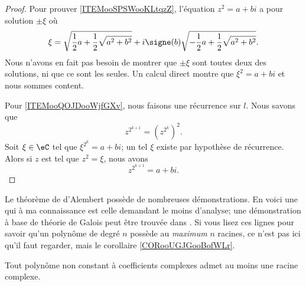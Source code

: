 \begin{proof}
    Pour prouver \ref{ITEMooSPSWooKLtqzZ}, l'équation \( z^2=a+bi\) a pour solution \( \pm\xi\) où
        \begin{equation}
            \xi=\sqrt{ \frac{ 1 }{2}a+\frac{ 1 }{2}\sqrt{ a^2+b^2 } }+i\signe(b)\sqrt{ -\frac{ 1 }{2}a+\frac{ 1 }{2}\sqrt{ a^2+b^2 } }.
        \end{equation}
        Nous n'avons en fait pas besoin de montrer que \( \pm\xi\) sont toutes deux des solutions, ni que ce sont les seules. Un calcul direct montre que \( \xi^2=a+bi\) et nous sommes content.

    Pour \ref{ITEMooQOJDooWjfGXv}, nous faisons une récurrence sur \( l\). Nous savons que
        \begin{equation}
            z^{2^{k+1}}=(z^{2^k})^2.
        \end{equation}
        Soit \( \xi\in \eC\) tel que \( \xi^{2^k}=a+bi\); un tel \( \xi\) existe par hypothèse de récurrence. Alors si \( z\) est tel que \( z^2=\xi\), nous avons 
        \begin{equation}
            z^{2^{k+1}}=a+bi.
        \end{equation}
\end{proof}

Le théorème de d'Alembert possède de nombreuses démonstrations. En voici une qui à ma connaissance est celle demandant le moins d'analyse; une démonstration à base de théorie de Galois peut être trouvée dans \cite{rqrNyg,ooPSLMooAVODjn}. Si vous lisez ces lignes pour savoir qu'un polynôme de degré \( n\) possède au \emph{maximum} \( n\) racines, ce n'est pas ici qu'il faut regarder, mais le corollaire \ref{CORooUGJGooBofWLr}.
\begin{theorem}   \label{THOooIRJYooBiHRyW}
    Tout polynôme non constant à coefficients complexes admet au moins une racine complexe.
\end{theorem}

